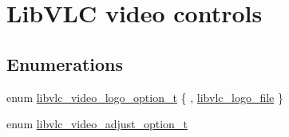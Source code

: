 \hypertarget{group__libvlc__video}{}\section{Lib\+V\+LC video controls}
\label{group__libvlc__video}
\subsection*{Enumerations}
\begin{DoxyCompactItemize}
\item 
enum \hyperlink{group__libvlc__video_gab2220c742f81231300c19d9a24b1dd3b}{libvlc\+\_\+video\+\_\+logo\+\_\+option\+\_\+t} \{ , \hyperlink{group__libvlc__video_ggab2220c742f81231300c19d9a24b1dd3ba9fd5aff60b24f0a80c9a12fdb860b37f}{libvlc\+\_\+logo\+\_\+file}
 \}
\item 
enum \hyperlink{group__libvlc__video_ga1093996bbcbb93f0d0a49636917f09c4}{libvlc\+\_\+video\+\_\+adjust\+\_\+option\+\_\+t} 
\end{DoxyCompactItemize}

